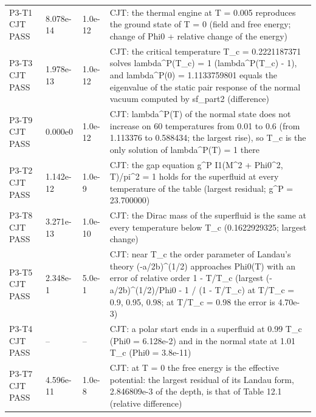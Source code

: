 \documentclass[aps,prd,onecolumn,superscriptaddress,nofootinbib,floatfix,longbibliography]{revtex4-2}
\begin{document}
\begin{longtable}{p{}p{}p{}p{}}
P3-T1 CJT \newline PASS & 8.078e-14 & 1.0e-12 & CJT: the thermal engine at T = 0.005 reproduces the ground state of T = 0 (field and free energy; \textbar{}change of Phi0\textbar{} + relative change of the energy) \\
P3-T3 CJT \newline PASS & 1.978e-13 & 1.0e-12 & CJT: the critical temperature T\_c = 0.2221187371 solves lambda\textasciicircum{}P(T\_c) = 1 (\textbar{}lambda\textasciicircum{}P(T\_c) - 1\textbar{}), and lambda\textasciicircum{}P(0) = 1.1133759801 equals the eigenvalue of the static pair response of the normal vacuum computed by sf\_part2 (difference) \\
P3-T9 CJT \newline PASS & 0.000e0 & 1.0e-12 & CJT: lambda\textasciicircum{}P(T) of the normal state does not increase on 60 temperatures from 0.01 to 0.6 (from 1.113376 to 0.588434; the largest rise), so T\_c is the only solution of lambda\textasciicircum{}P(T) = 1 there \\
P3-T2 CJT \newline PASS & 1.142e-12 & 1.0e-9 & CJT: the gap equation g\textasciicircum{}P I1(M\textasciicircum{}2 + Phi0\textasciicircum{}2, T)/pi\textasciicircum{}2 = 1 holds for the superfluid at every temperature of the table (largest \textbar{}residual\textbar{}; g\textasciicircum{}P = 23.700000) \\
P3-T8 CJT \newline PASS & 3.271e-13 & 1.0e-10 & CJT: the Dirac mass of the superfluid is the same at every temperature below T\_c (0.1622929325; largest change) \\
P3-T5 CJT \newline PASS & 2.348e-1 & 5.0e-1 & CJT: near T\_c the order parameter of Landau's theory (-a/2b)\textasciicircum{}(1/2) approaches Phi0(T) with an error of relative order 1 - T/T\_c (largest \textbar{}(-a/2b)\textasciicircum{}(1/2)/Phi0 - 1\textbar{} / (1 - T/T\_c) at T/T\_c = 0.9, 0.95, 0.98; at T/T\_c = 0.98 the error is 4.70e-3) \\
P3-T4 CJT \newline PASS & -- & -- & CJT: a polar start ends in a superfluid at 0.99 T\_c (Phi0 = 6.128e-2) and in the normal state at 1.01 T\_c (Phi0 = 3.8e-11) \\
P3-T7 CJT \newline PASS & 4.596e-11 & 1.0e-8 & CJT: at T = 0 the free energy is the effective potential: the largest residual of its Landau form, 2.846809e-3 of the depth, is that of Table 12.1 (relative difference) \\

\end{longtable}
\end{document}
